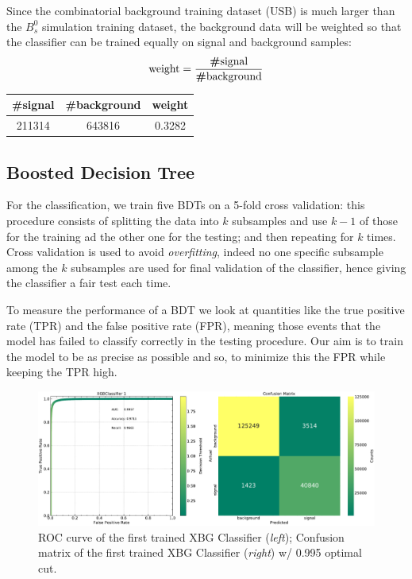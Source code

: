 Since the combinatorial background training dataset (USB) is much larger than the $B_s^0$ simulation training dataset, the background data will be weighted so that the classifier can be trained equally on signal and background samples:
\[
\text{weight}=\frac{\text{\textbf{\#}signal}}{\text{\textbf{\#}background}}
\]

\begin{center}
\begin{tabular}{||c c c||} 
 \hline
 \textbf{\#}signal & \textbf{\#}background & weight \\ [0.5ex] 
 \hline
 211314 & 643816 & 0.3282 \\ 
 \hline
\end{tabular}
\end{center}

\subsection{Boosted Decision Tree}

For the classification, we train five BDTs on a 5-fold cross validation: this procedure consists of splitting the data into $k$ subsamples and use $k-1$ of those for the training ad the other one for the testing; and then repeating for $k$ times. Cross validation is used to avoid \emph{overfitting}, indeed no one specific subsample among the $k$ subsamples are used for final validation of the classifier, hence giving the classifier a fair test each time.

To measure the performance of a BDT we look at quantities like the true positive rate (TPR) and the false positive rate (FPR), meaning those events that the model has failed to classify correctly in the testing procedure. Our aim is to train the model to be as precise as possible and so, to minimize this the FPR while keeping the TPR high.

\begin{figure}[H]
    \centering
    \includegraphics[width=0.90\linewidth]{graphs/clf0.pdf}
    \caption{ROC curve of the first trained XBG Classifier (\emph{left}); Confusion matrix of the first trained XBG Classifier (\emph{right}) w/ 0.995 optimal cut.}
    \label{roc}
\end{figure}

